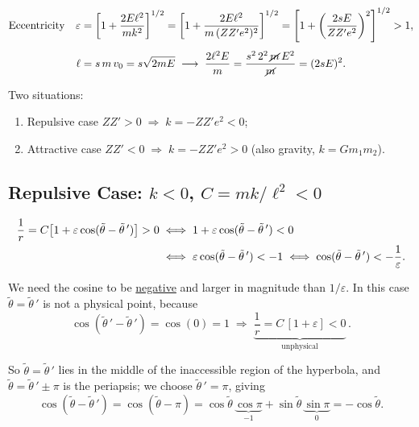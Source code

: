 \documentclass[11pt]{article}
\begin{document}
\begin{gather}
\text{Eccentricity}\quad
\varepsilon = \left[1 + \frac{2E\ell^{2}}{m k^{2}}\right]^{1/2}
 = \left[1 + \frac{2E\ell^{2}}{m\,(Z Z' e^{2})^{2}}\right]^{1/2}
 = \left[1 + \left(\frac{2sE}{Z Z' e^{2}}\right)^{2}\right]^{1/2} > 1,\\[4pt]
\ell = s\,m\,v_{0} = s\sqrt{2mE}
 \;\longrightarrow\;
 \frac{2\ell^{2}E}{m} = \frac{s^{2}\,2^{2}\,\cancel{m}\,E^{2}}{\cancel{m}}
 = (2sE)^{2}.
\end{gather}

Two situations:
\begin{enumerate}[label=\roman*)]
\item Repulsive case \quad $Z Z' > 0 \;\Rightarrow\; k = -Z Z' e^{2} < 0$;
\item Attractive case \quad $Z Z' < 0 \;\Rightarrow\; k = -Z Z' e^{2} > 0$
      \quad (also gravity, $k = G m_{1} m_{2}$).
\end{enumerate}

\subsection{Repulsive Case: \texorpdfstring{$k<0$}{k<0}, \texorpdfstring{$C=mk/\ell^2<0$}{C=mk/l2<0}}

\begin{align}
\frac{1}{r} = C\bigl[1 + \varepsilon\cos(\tilde\theta-\tilde\theta\,')\bigr] > 0
&\iff 1 + \varepsilon\cos(\tilde\theta-\tilde\theta\,') < 0\notag\\
&\iff \varepsilon\cos(\tilde\theta-\tilde\theta\,') < -1
 \iff \cos(\tilde\theta-\tilde\theta\,') < -\frac{1}{\varepsilon}.
\end{align}

We need the cosine to be \underline{negative} and larger in magnitude than
$1/\varepsilon$. In this case $\tilde\theta = \tilde\theta\,'$ is not a physical
point, because
\begin{equation}
\cos(\tilde\theta\,'-\tilde\theta\,') = \cos(0) = 1
\;\Longrightarrow\;
\underbrace{\frac{1}{r} = C\,[1+\varepsilon] < 0}_{\text{unphysical}}\,.
\end{equation}

So $\tilde\theta = \tilde\theta\,'$ lies in the middle of the inaccessible
region of the hyperbola, and $\tilde\theta = \tilde\theta\,' \pm \pi$ is the
periapsis; we choose $\tilde\theta\,' = \pi$, giving
\begin{equation}
\cos(\tilde\theta - \tilde\theta\,') = \cos(\tilde\theta - \pi)
 = \cos\tilde\theta\,\underbrace{\cos\pi}_{-1}
 + \sin\tilde\theta\,\underbrace{\sin\pi}_{0}
 = -\cos\tilde\theta.
\end{equation}
\end{document}

